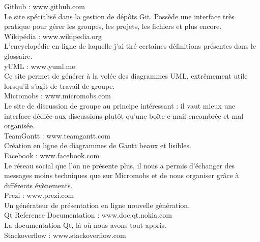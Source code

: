 \documentclass[a4paper, 12pt]{report}
\begin{document}
	\renewcommand\glossaryname{Glossaire}
	\renewcommand{\glsnamefont}[1]{\makefirstuc{#1}} %
	\printglossaries
	\renewcommand\bibname{Sitographie}%
	\begin{thebibliography}{2}
		\label{sitographie}
		Github : www.github.com \\
		Le site spécialisé dans la gestion de dépôts \gls{Git}. Possède une interface très pratique pour gérer les groupes, les projets,
		les fichiers et plus encore.
		~\\
		Wikipédia : www.wikipedia.org \\
		L'encyclopédie en ligne de laquelle j'ai tiré certaines définitions présentes dans le glossaire.
		~\\
		yUML : www.yuml.me \\
		Ce site permet de générer à la volée des diagrammes \gls{UML}, extrêmement utile lorsqu'il s'agit de travail de groupe.
		~\\
		Micromobs : www.micromobs.com \\
		Le site de discussion de groupe au principe intéressant : il vaut mieux une interface dédiée aux discussions plutôt
		qu'une boîte e-mail encombrée et mal organisée.
		~\\
		TeamGantt : www.teamgantt.com \\
		Création en ligne de diagrammes de Gantt beaux et lisibles.
		~\\
		Facebook : www.facebook.com \\
		Le réseau social que l'on ne présente plus, il nous a permis d'échanger des messages moins techniques que sur Micromobs
		et de nous organiser grâce à différents évènements.
		~\\
		Prezi : www.prezi.com \\
		Un générateur de présentation en ligne nouvelle génération.
		~\\
		Qt Reference Documentation : www.doc.qt.nokia.com \\
		La documentation Qt, là où nous avons tout appris.	
		~\\
		Stackoverflow : www.stackoverflow.com \\

\end{thebibliography}
\end{document}
